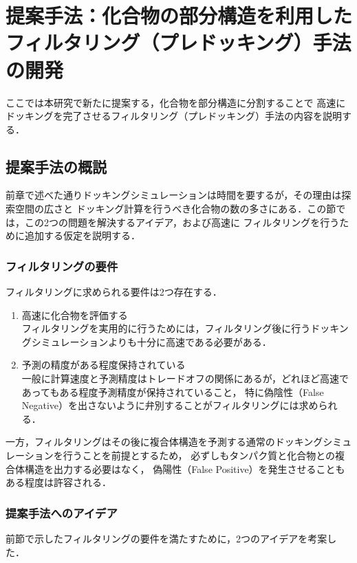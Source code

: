 \chapter{提案手法：化合物の部分構造を利用したフィルタリング（プレドッキング）手法の開発}
ここでは本研究で新たに提案する，化合物を部分構造に分割することで
高速にドッキングを完了させるフィルタリング（プレドッキング）手法の内容を説明する．

\section{提案手法の概説}
前章で述べた通りドッキングシミュレーションは時間を要するが，その理由は探索空間の広さと
ドッキング計算を行うべき化合物の数の多さにある．この節では，この2つの問題を解決するアイデア，および高速に
フィルタリングを行うために追加する仮定を説明する．

\subsection{フィルタリングの要件}\label{subsec}
フィルタリングに求められる要件は2つ存在する．
\begin{enumerate}
\item 高速に化合物を評価する\\
	フィルタリングを実用的に行うためには，フィルタリング後に行うドッキングシミュレーションよりも十分に高速である必要がある．
\item 予測の精度がある程度保持されている\\
	一般に計算速度と予測精度はトレードオフの関係にあるが，どれほど高速であってもある程度予測精度が保持されていること，
	特に偽陰性（False Negative）を出さないように弁別することがフィルタリングには求められる．
\end{enumerate}
一方，フィルタリングはその後に複合体構造を予測する通常のドッキングシミュレーションを行うことを前提とするため，
必ずしもタンパク質と化合物との複合体構造を出力する必要はなく，
偽陽性（False Positive）を発生させることもある程度は許容される．

\subsection{提案手法へのアイデア}\label{subsec:idea}
前節で示したフィルタリングの要件を満たすために，2つのアイデアを考案した．

